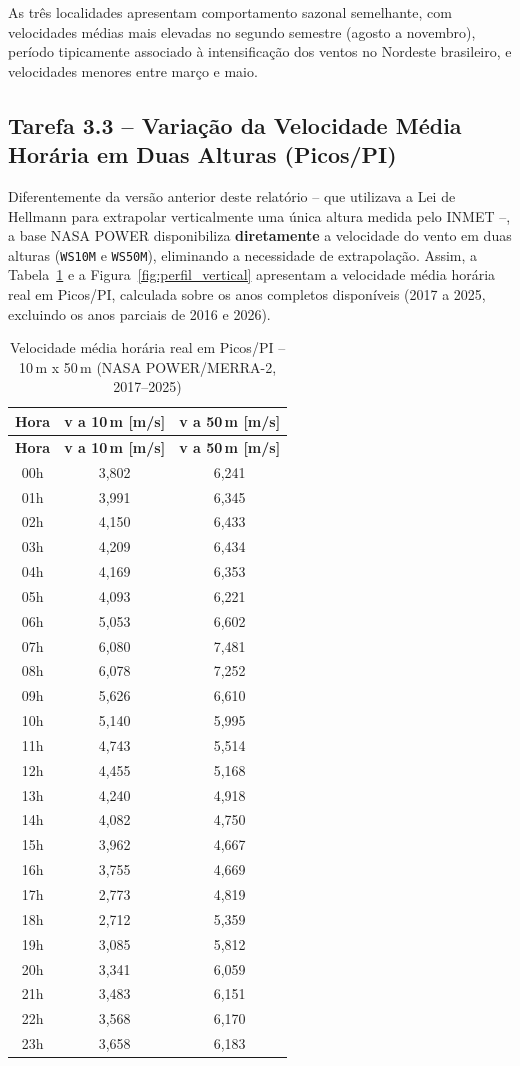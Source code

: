 \documentclass[11pt,a4paper]{article}
\begin{document}
\noindent As três localidades apresentam comportamento sazonal
semelhante, com velocidades médias mais elevadas no segundo semestre
(agosto a novembro), período tipicamente associado à intensificação
dos ventos no Nordeste brasileiro, e velocidades menores entre
março e maio.

\subsection{Tarefa 3.3 -- Variação da Velocidade Média Horária em
Duas Alturas (Picos/PI)}

Diferentemente da versão anterior deste relatório -- que utilizava a Lei de
Hellmann para extrapolar verticalmente uma única altura medida pelo INMET --,
a base NASA POWER disponibiliza \textbf{diretamente} a velocidade do vento em
duas alturas (\texttt{WS10M} e \texttt{WS50M}), eliminando a necessidade de
extrapolação. Assim, a Tabela~\ref{tab:perfil_vertical} e a
Figura~\ref{fig:perfil_vertical} apresentam a velocidade média horária real
em Picos/PI, calculada sobre os anos completos disponíveis (2017 a 2025,
excluindo os anos parciais de 2016 e 2026).

\begin{longtable}{ccc}
\caption{Velocidade média horária real em Picos/PI -- 10\,m x 50\,m
(NASA POWER/MERRA-2, 2017--2025)}
\label{tab:perfil_vertical}\\
\toprule
\textbf{Hora} & \textbf{v a 10\,m [m/s]} & \textbf{v a 50\,m [m/s]}\\
\midrule
\endfirsthead
\toprule
\textbf{Hora} & \textbf{v a 10\,m [m/s]} & \textbf{v a 50\,m [m/s]}\\
\midrule
\endhead
00h & 3,802 & 6,241\\
01h & 3,991 & 6,345\\
02h & 4,150 & 6,433\\
03h & 4,209 & 6,434\\
04h & 4,169 & 6,353\\
05h & 4,093 & 6,221\\
06h & 5,053 & 6,602\\
07h & 6,080 & 7,481\\
08h & 6,078 & 7,252\\
09h & 5,626 & 6,610\\
10h & 5,140 & 5,995\\
11h & 4,743 & 5,514\\
12h & 4,455 & 5,168\\
13h & 4,240 & 4,918\\
14h & 4,082 & 4,750\\
15h & 3,962 & 4,667\\
16h & 3,755 & 4,669\\
17h & 2,773 & 4,819\\
18h & 2,712 & 5,359\\
19h & 3,085 & 5,812\\
20h & 3,341 & 6,059\\
21h & 3,483 & 6,151\\
22h & 3,568 & 6,170\\
23h & 3,658 & 6,183\\
\bottomrule
\end{longtable}
\end{document}
